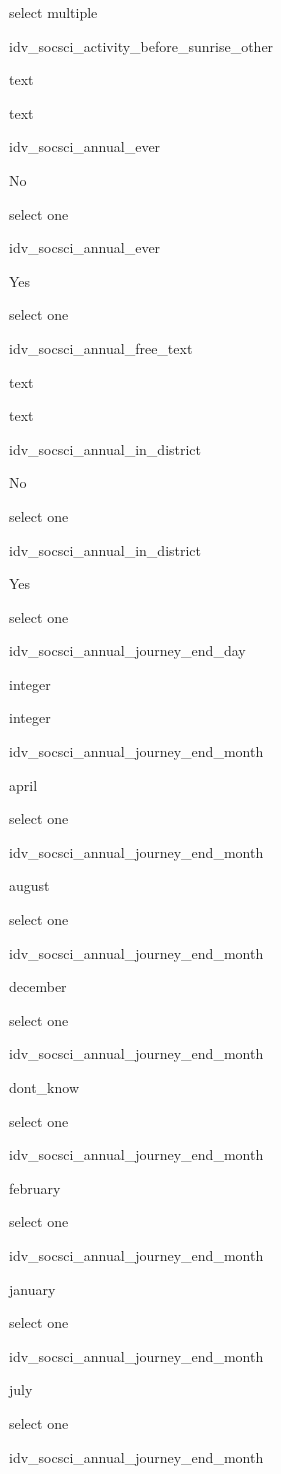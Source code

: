 \documentclass[]{article}
\begin{document}
select multiple

idv\_socsci\_activity\_before\_sunrise\_other

text

text

idv\_socsci\_annual\_ever

No

select one

idv\_socsci\_annual\_ever

Yes

select one

idv\_socsci\_annual\_free\_text

text

text

idv\_socsci\_annual\_in\_district

No

select one

idv\_socsci\_annual\_in\_district

Yes

select one

idv\_socsci\_annual\_journey\_end\_day

integer

integer

idv\_socsci\_annual\_journey\_end\_month

april

select one

idv\_socsci\_annual\_journey\_end\_month

august

select one

idv\_socsci\_annual\_journey\_end\_month

december

select one

idv\_socsci\_annual\_journey\_end\_month

dont\_know

select one

idv\_socsci\_annual\_journey\_end\_month

february

select one

idv\_socsci\_annual\_journey\_end\_month

january

select one

idv\_socsci\_annual\_journey\_end\_month

july

select one

idv\_socsci\_annual\_journey\_end\_month
\end{document}
